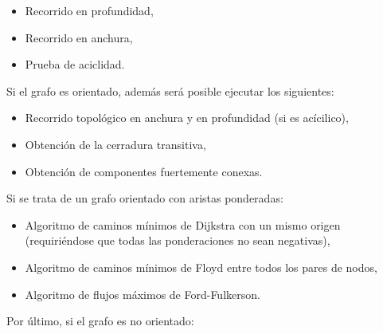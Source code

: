\documentclass{book}
\begin{document}
	\begin{itemize}
		\renewcommand{\labelitemi}{\scriptsize\tiny$\blacksquare$} 
		\itemsep=2pt \topsep=0pt \partopsep=0pt \parskip=0pt \parsep=0pt
		
		\item Recorrido en profundidad,

		\item Recorrido en anchura,

		\item Prueba de aciclidad.

	\end{itemize}
	\medskip

	\noindent Si el grafo es orientado, además será posible ejecutar los siguientes:
	\medskip

	\begin{itemize}
		\renewcommand{\labelitemi}{\scriptsize\tiny$\blacksquare$} 
		\itemsep=2pt \topsep=0pt \partopsep=0pt \parskip=0pt \parsep=0pt
		
		\item Recorrido topológico en anchura y en profundidad (si es acícilico),

		\item Obtención de la cerradura transitiva,

		\item Obtención de componentes fuertemente conexas.

	\end{itemize}
	\medskip

	\noindent Si se trata de un grafo orientado con aristas ponderadas:
	\medskip

	\begin{itemize}
		\renewcommand{\labelitemi}{\scriptsize\tiny$\blacksquare$} 
		\itemsep=2pt \topsep=0pt \partopsep=0pt \parskip=0pt \parsep=0pt
		
		\item Algoritmo de caminos mínimos de Dijkstra con un mismo origen (requiriéndose que todas las ponderaciones no sean negativas),

		\item Algoritmo de caminos mínimos de Floyd entre todos los pares de nodos,

		\item Algoritmo de flujos máximos de Ford-Fulkerson.

	\end{itemize}
	\medskip

	\noindent Por último, si el grafo es no orientado:
	\medskip
\end{document}
